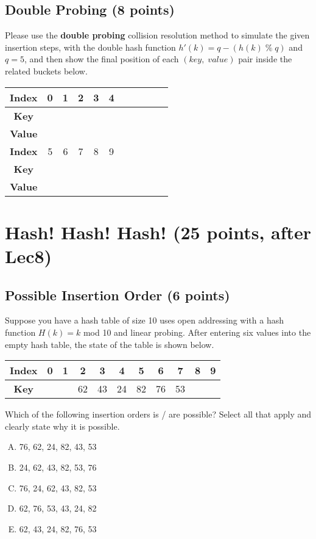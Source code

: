 \documentclass[11pt]{exam}
\begin{document}
\subsection{Double Probing (8 points)}
Please use the \textbf{double probing} collision resolution method to simulate the given insertion steps, with the double hash function $h'(k) = q - (h(k) \;\%\; q)$ and $q=5$, and then show the final position of each $(key,\;value)$ pair inside the related buckets below.
\begin{solution}
\begin{table}[H]
\centering
\renewcommand{\arraystretch}{2}
\setlength{\tabcolsep}{11mm}
\begin{tabular}{|c|c|c|c|c|c|c|c|c|c|c|}
\hline
\textbf{Index}&0&1&2&3&4\\
\hline
\textbf{Key}&&&&&\\
\hline
\textbf{Value}&&&&&\\
\hline
\textbf{Index}&5&6&7&8&9\\
\hline
\textbf{Key}&&&&&\\
\hline
\textbf{Value}&&&&&\\
\hline
\end{tabular}
\end{table}
\end{solution}
\section{Hash! Hash! Hash! (25 points, after Lec8)}

\subsection{Possible Insertion Order (6 points)}
Suppose you have a hash table of size 10 uses open addressing with a hash function $H(k) = k$ mod 10 and linear probing. After entering six values into the empty hash table, the state of the table is shown below.

\begin{table}[H]
\centering
\setlength{\tabcolsep}{5.5mm}
\begin{tabular}{|c|c|c|c|c|c|c|c|c|c|c|}
\hline
\textbf{Index}&0&1&2&3&4&5&6&7&8&9\\
\hline
\textbf{Key}&&&62&43&24&82&76&53&&\\
\hline
\end{tabular}
\end{table}
Which of the following insertion orders is / are possible? Select all that apply and clearly state why it is possible.
\begin{enumerate}[A.]
\item 76, 62, 24, 82, 43, 53
\item 24, 62, 43, 82, 53, 76
\item 76, 24, 62, 43, 82, 53
\item 62, 76, 53, 43, 24, 82
\item 62, 43, 24, 82, 76, 53
\end{enumerate}
\end{document}

